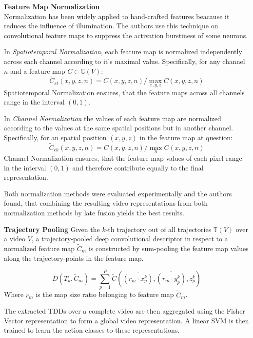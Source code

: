 \textbf{Feature Map Normalization}\\
Normalization has been widely applied to hand-crafted features beacause it reduces the influence of illumination.
The authors use this technique on convolutional feature maps to suppress the activation burstiness of some neurons.

In \textit{Spatiotemporal Normalization}, each feature map is normalized independently across each channel according to it's maximal value.
Specifically, for any channel $n$ and a feature map $C \in \mathbb{C}(V)$:
\begin{equation*}
    \tilde{C}_{st}(x,y,z,n) = C(x,y,z,n) / \max_{x,y,z} C(x,y,z,n)
\end{equation*}
Spatiotemporal Normalization ensures, that the feature maps across all channels range in the interval $(0,1)$.

In \textit{Channel Normalization} the values of each feature map are normalized according to the values at the same spatial positions but in another channel.
Specifically, for an spatial position $(x,y,z)$ in the feature map at question:
\begin{equation*}
    \tilde{C}_{ch}(x,y,z,n) = C(x,y,z,n) / \max_{n} C(x,y,z,n)
\end{equation*}
Channel Normalization ensures, that the feature map values of each pixel range in the interval $(0,1)$ and therefore contribute equally to the final representation.

Both normalization methods were evaluated experimentally and the authors found, that combining the resulting video representations from both normalization methods by late fusion yields the best results.

\textbf{Trajectory Pooling}
Given the $k$-th trajectory out of all trajectories $\mathbb{T}(V)$ over a video $V$, a trajectory-pooled deep convolutional descriptor in respect to a normalized feature map $\tilde{C}_m$ is constructed by sum-pooling the feature map values along the trajectory-points in the feature map.

\begin{equation*}
    D(T_k, \tilde{C}_m) = \sum_{p=1}^P \tilde{C}(\overline{(r_m \cdot x_p^k)}, \overline{(r_m \cdot y_p^k)}, z_p^k)
\end{equation*}
Where $r_m$ is the map size ratio belonging to feature map $\tilde{C}_m$.

The extracted TDDs over a complete video are then aggregated using the Fisher Vector representation \cite{sanchez_image_2013} to form a global video representation.
A linear SVM is then trained to learn the action classes to these representations.

